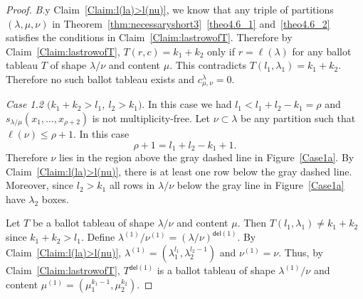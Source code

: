 \documentclass[ALCO,ThmDefs,Unicode,epreuves]{cedram}
\newcommand{\del}{\mathsf{del}}
\let\hypertargeta\hypertarget %
\newenvironment{Case}[1]{\par\vskip2pt\noindent%
\emph{#1}.}{\vskip2pt}
\begin{document}
\begin{proof}
\begin{Case}
By Claim~\ref{Claim:l(la)>l(nu)}, we know that any triple of partitions $(\lambda,\mu,\nu)$ in Theorem~\ref{thm:necessaryshort3}~\ref{theo4.6_1} and~\ref{theo4.6_2} satisfies the conditions in Claim~\ref{Claim:lastrowofT}. Therefore by Claim~\ref{Claim:lastrowofT}, $T(r,c) = k_1+k_2$ only if $r = \ell(\lambda)$ for any ballot tableau $T$ of shape $\lambda/\nu$ and content $\mu$. This contradicts $T(l_1,\lambda_1) = k_1+k_2$. Therefore no such ballot tableau exists and $c^{\lambda}_{\mu,\nu} = 0$.

\end{Case}

\begin{Case}
{\hypertargeta{theo4.6_case1.2}{Case 1.2} $(k_1+k_2 > l_1$, $l_2>k_1)$} 
In this case we had $l_1<l_1+l_2-k_1=\rho$ and $s_{\lambda/\mu}(x_1,\ldots,x_{\rho+2})$ is not multiplicity-free. Let $\nu\subset \lambda$ be any partition such that $\ell(\nu) \leq \rho+1$. In this case
\begin{equation}
\label{eq:case1.2rho}
\rho+1 = l_1+l_2-k_1 + 1.
\end{equation}
Therefore $\nu$ lies in the region above the gray dashed line in Figure~\ref{Case1a}. By Claim~\ref{Claim:l(la)>l(nu)}, there is at least one row below the gray dashed line. Moreover, since $l_2 > k_1$ all rows in $\lambda/\nu$ below the gray line in Figure~\ref{Case1a} have $\lambda_2$ boxes. 

Let $T$ be a ballot tableau of shape $\lambda/\nu$ and content $\mu$. Then $T(l_1,\lambda_1)\neq k_1+k_2$ since $k_1+k_2 > l_1$. Define $\lambda^{(1)}/ \nu^{(1)} = (\lambda / \nu)^{\del (1)}$. By Claim~\ref{Claim:l(la)>l(nu)}, $\lambda^{(1)} = (\lambda_1^{l_1},\lambda_2^{l_2-1})$ and $\nu^{(1)} = \nu$. Thus, by Claim~\ref{Claim:lastrowofT}, $T^{\del (1)}$ is a ballot tableau of shape $\lambda^{(1)}/\nu$ and content $\mu^{(1)} = (\mu_1^{k_1-1},\mu_2^{k_2})$.



\end{Case}
\end{proof}
\end{document}
